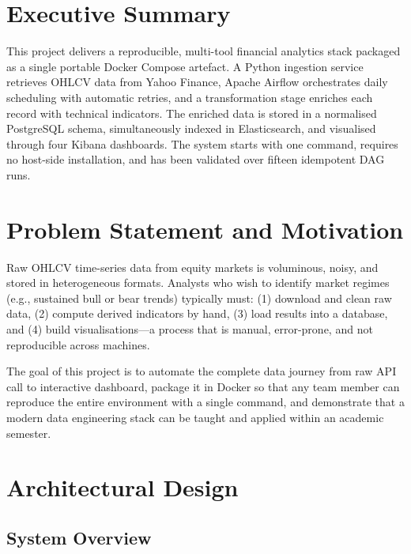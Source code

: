 \documentclass[conference]{IEEEtran}
\begin{document}
\section{Executive Summary}

This project delivers a reproducible, multi-tool financial analytics stack packaged
as a single portable Docker Compose artefact. A Python ingestion service retrieves
OHLCV data from Yahoo Finance, Apache Airflow orchestrates daily scheduling with
automatic retries, and a transformation stage enriches each record with technical
indicators. The enriched data is stored in a normalised PostgreSQL schema,
simultaneously indexed in Elasticsearch, and visualised through four Kibana
dashboards. The system starts with one command, requires no host-side installation,
and has been validated over fifteen idempotent DAG runs.

\section{Problem Statement and Motivation}

Raw OHLCV time-series data from equity markets is voluminous, noisy, and
stored in heterogeneous formats. Analysts who wish to identify market regimes
(e.g., sustained bull or bear trends) typically must: (1) download and clean raw
data, (2) compute derived indicators by hand, (3) load results into a database,
and (4) build visualisations---a process that is manual, error-prone, and not
reproducible across machines.

The goal of this project is to automate the complete data journey from raw API
call to interactive dashboard, package it in Docker so that any team member can
reproduce the entire environment with a single command, and demonstrate that a
modern data engineering stack can be taught and applied within an academic semester.

\section{Architectural Design}

\subsection{System Overview}
\end{document}
